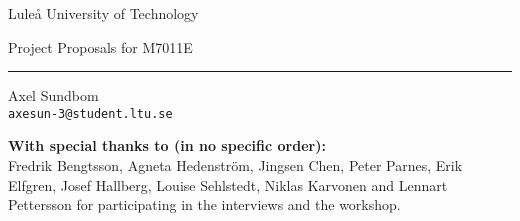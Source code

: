 \centering

{\Huge Luleå University of Technology}\par
\vspace{1ex}
{\Large Project Proposals for M7011E}\par
\rule{.5\textwidth}{.4pt}



\vspace{4ex}
\begin{minipage}{.3\textwidth}
\centering
Axel Sundbom\\
\texttt{axesun-3@student.ltu.se}
\end{minipage}

\vfill
\begin{abstract}
\noindent This document describes some programming project assignments for the course M7011E that came out of a fifth year project for computer engineering students. Most of these assignments are results of interviews with examiners and suggestions from a workshop that was held as a part of the pre-study. You may redistribute this document under the terms and agreements of the MIT license.
\end{abstract}

\tableofcontents
\vfill
\textbf{With special thanks to (in no specific order):}\\
Fredrik Bengtsson, Agneta Hedenström, Jingsen Chen, Peter Parnes, Erik Elfgren, Josef Hallberg, Louise Sehlstedt, Niklas Karvonen and Lennart Pettersson for participating in the interviews and the workshop.

